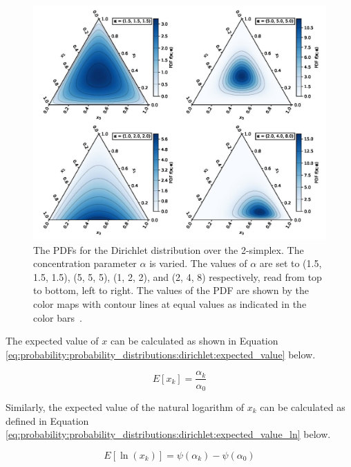 \begin{figure}[htbp]
      \includegraphics[width=\textwidth]{images/dirichlet.jpg}
      \caption{The \acp{PDF} for the Dirichlet distribution over the 2-simplex. The concentration parameter $\alpha$ is varied. The values of $\alpha$ are set to (1.5, 1.5, 1.5), (5, 5, 5), (1, 2, 2), and (2, 4, 8) respectively, read from top to bottom, left to right. The values of the \ac{PDF} are shown by the color maps with contour lines at equal values as indicated in the color bars~\cite{ref:dirichlet:2020}.}
      \label{fig:probability:probability_distributions:dirichlet}
\end{figure}

The expected value of $x$ can be calculated as shown in Equation \ref{eq:probability:probability_distributions:dirichlet:expected_value} below.

\begin{equation}
      \label{eq:probability:probability_distributions:dirichlet:expected_value}
      E[x_{k}] = \frac{\alpha_{k}}{\alpha_{0}}
\end{equation}

Similarly, the expected value of the natural logarithm of $x_{k}$ can be calculated as defined in Equation \ref{eq:probability:probability_distributions:dirichlet:expected_value_ln} below.

\begin{equation}
      \label{eq:probability:probability_distributions:dirichlet:expected_value_ln}
      E[\ln(x_{k})] = \psi({\alpha_{k}}) - \psi(\alpha_{0})
\end{equation}

